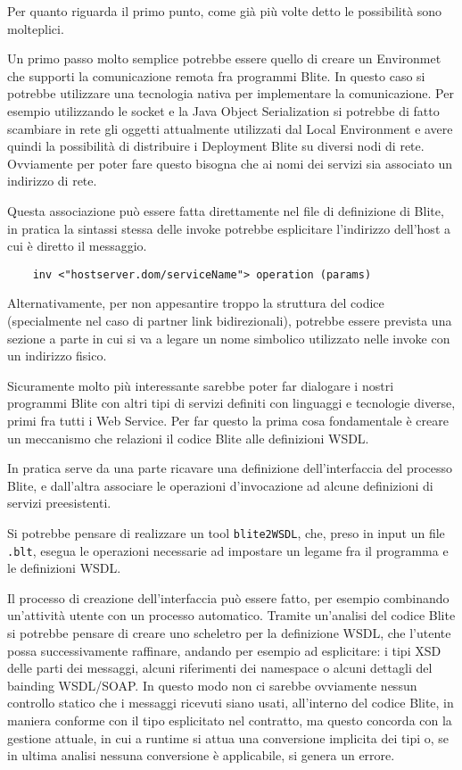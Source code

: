 Per quanto riguarda il primo punto, come già più volte detto le possibilità sono
molteplici. 

Un primo passo molto semplice potrebbe essere quello di creare un Environmet
che supporti la comunicazione remota fra programmi Blite. In questo caso si
potrebbe utilizzare una tecnologia nativa per implementare la comunicazione. Per
esempio utilizzando le socket e la Java Object Serialization si potrebbe di
fatto scambiare in rete gli oggetti attualmente utilizzati dal Local
Environment e avere quindi la possibilità di
distribuire i Deployment Blite su diversi nodi di rete. Ovviamente per poter
fare questo bisogna che ai nomi dei servizi sia associato un indirizzo di rete.

Questa associazione può essere fatta direttamente nel file di definizione di
Blite, in pratica la sintassi stessa delle invoke potrebbe esplicitare
l'indirizzo dell'host a cui è diretto il messaggio.

\begin{verbatim}
    inv <"hostserver.dom/serviceName"> operation (params) 
\end{verbatim}

Alternativamente, per non appesantire troppo la struttura del codice
(specialmente nel caso di partner link bidirezionali), potrebbe essere prevista
una sezione a parte in cui si va a legare un nome simbolico utilizzato nelle invoke con un
indirizzo fisico.

Sicuramente molto più interessante sarebbe poter far dialogare i nostri programmi
Blite con altri tipi di servizi definiti con linguaggi e tecnologie diverse,
primi fra tutti i Web Service. Per far questo la prima cosa fondamentale è creare un
meccanismo che relazioni il codice Blite alle definizioni WSDL.

In pratica serve da una parte ricavare una definizione dell'interfaccia del
processo Blite, e dall'altra associare le operazioni d'invocazione ad alcune
definizioni di servizi preesistenti.

Si potrebbe pensare di realizzare un tool \texttt{blite2WSDL}, che, preso in
input un file \texttt{.blt}, esegua le operazioni necessarie ad impostare un
legame fra il programma e le definizioni WSDL.

Il processo di creazione dell'interfaccia può essere fatto, per esempio
combinando un'attività utente con un processo automatico. 
Tramite un'analisi del codice Blite si potrebbe pensare di creare uno
scheletro per la definizione WSDL, che l'utente possa successivamente
raffinare, andando per esempio ad esplicitare: i tipi XSD delle parti dei
messaggi, alcuni riferimenti dei namespace o alcuni dettagli del bainding
WSDL/SOAP. In questo modo non ci sarebbe ovviamente nessun controllo statico che
i messaggi ricevuti siano usati, all'interno del codice Blite, in maniera
conforme con il tipo esplicitato nel contratto, ma questo concorda con la gestione
attuale, in cui a runtime si attua una conversione implicita dei tipi o, se in
ultima analisi nessuna conversione è applicabile, si genera un errore. 

